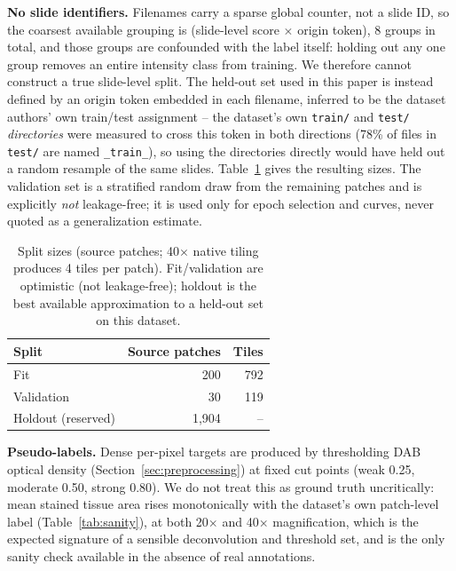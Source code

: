 \documentclass[conference]{IEEEtran}
\begin{document}
\textbf{No slide identifiers.} Filenames carry a sparse global counter, not
a slide ID, so the coarsest available grouping is (slide-level score
$\times$ origin token), 8 groups in total, and those groups are confounded
with the label itself: holding out any one group removes an entire
intensity class from training. We therefore cannot construct a true
slide-level split. The held-out set used in this paper is instead defined
by an origin token embedded in each filename, inferred to be the dataset
authors' own train/test assignment -- the dataset's own \texttt{train/} and
\texttt{test/} \emph{directories} were measured to cross this token in both
directions (78\% of files in \texttt{test/} are named \texttt{\_train\_}),
so using the directories directly would have held out a random resample of
the same slides. Table~\ref{tab:splitsizes} gives the resulting sizes. The
validation set is a stratified random draw from the remaining patches and
is explicitly \emph{not} leakage-free; it is used only for epoch selection
and curves, never quoted as a generalization estimate.

\begin{table}[t]
\centering
\caption{Split sizes (source patches; 40$\times$ native tiling produces
4 tiles per patch). Fit/validation are optimistic (not leakage-free);
holdout is the best available approximation to a held-out set on this
dataset.}
\label{tab:splitsizes}
\begin{tabular}{lrr}
\toprule
Split & Source patches & Tiles \\
\midrule
Fit & 200 & 792 \\
Validation & 30 & 119 \\
Holdout (reserved) & 1{,}904 & -- \\
\bottomrule
\end{tabular}
\end{table}

\textbf{Pseudo-labels.} Dense per-pixel targets are produced by thresholding
DAB optical density (Section~\ref{sec:preprocessing}) at fixed cut points
(weak 0.25, moderate 0.50, strong 0.80). We do not treat this as ground
truth uncritically: mean stained tissue area rises monotonically with the
dataset's own patch-level label (Table~\ref{tab:sanity}), at both
20$\times$ and 40$\times$ magnification, which is the expected signature of
a sensible deconvolution and threshold set, and is the only sanity check
available in the absence of real annotations.
\end{document}
